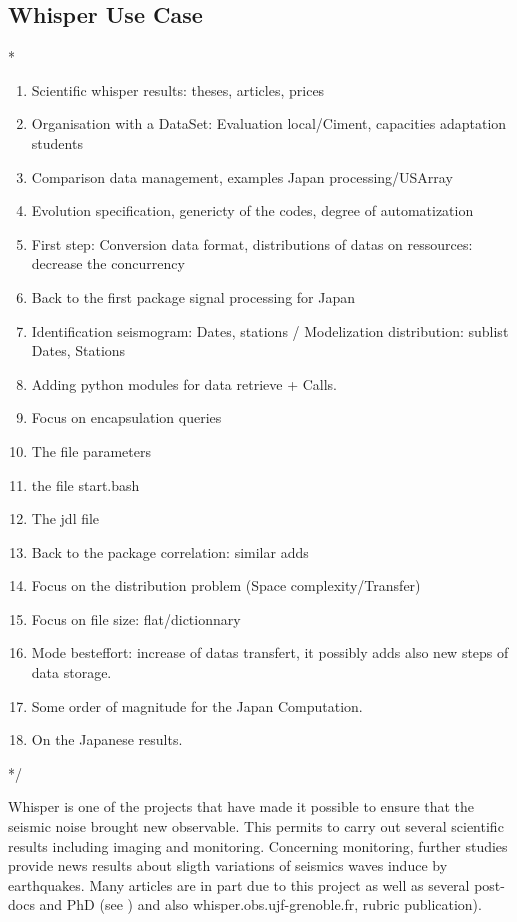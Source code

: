 \documentclass[a4paper, 10pt]{article}
\begin{document}
\begin{multicols}{2}
\subsection{Whisper Use Case}
\/*
	\begin{enumerate}
	  \item Scientific whisper results: theses, articles, prices
  	  \item Organisation with a DataSet: Evaluation local/Ciment, capacities adaptation students
  	  \item Comparison data management, examples Japan processing/USArray 
  	  \item Evolution specification, genericty of the codes, degree of automatization
  	  \item First step: Conversion data format, distributions of datas on ressources: decrease the concurrency
  	  \item Back to the first package signal processing for Japan
  	  \item Identification seismogram: Dates, stations  / Modelization distribution: sublist Dates, Stations
  	  \item Adding python modules for data retrieve + Calls.
  	  \item Focus on encapsulation queries
      \item The file parameters
      \item the file start.bash
      \item The jdl file
  	  \item Back to the package correlation: similar adds 
  	  \item Focus on the distribution problem (Space complexity/Transfer)
  	  \item Focus on file size: flat/dictionnary
  	  \item Mode besteffort: increase of datas transfert, it possibly adds also new steps of data storage.
  	  \item Some order of magnitude for the Japan Computation.
  	  \item On the Japanese results.
  	\end{enumerate}
*/

Whisper is one of the projects that have made it possible to ensure that the seismic noise brought new observable.
This permits to carry out several scientific results including imaging and monitoring. 
Concerning monitoring, further studies provide news results about sligth variations of seismics waves induce by earthquakes.
Many articles are in part due to this project as well as
several post-docs and PhD (see \cite{key:CFLC2010, key:BPCPBR, key:HCM2014, key:OPLC2013, key:PCP}) and also whisper.obs.ujf-grenoble.fr, rubric publication).



\end{multicols}
\end{document}
